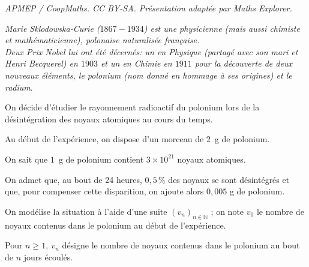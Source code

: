 \documentclass[10pt]{article}
\providecommand{\N}{\mathbb{N}}
\begin{document}
\noindent\textit{APMEP / CoopMaths. CC BY-SA. Présentation adaptée par Maths Explorer.}\par\medskip
\medskip

\emph{Marie Sklodowska-Curie ($1867-1934$) est une physicienne (mais aussi chimiste et mathématicienne), polonaise naturalisée française.\\
Deux Prix Nobel lui ont été décernés: un en Physique (partagé avec son mari et Henri Becquerel) en $1903$ et un en Chimie en $1911$ pour la découverte de deux nouveaux éléments, le polonium (nom donné en hommage à ses origines) et le radium}.

\medskip

On décide d'étudier le rayonnement radioactif du polonium lors de la désintégration des noyaux atomiques au cours du temps.

Au début de l'expérience, on dispose d'un morceau de $2$~g de polonium.

On sait que $1$~g de polonium contient $3 \times 10^{21}$ noyaux atomiques.

On admet que, au bout de 24 heures, $0,5\,\%$ des noyaux se sont désintégrés et que, pour compenser cette disparition, on ajoute alors $0,005$ g de polonium.

On modélise la situation à l'aide d'une suite $\left(v_n\right)_{n \in \N}$ ; on note $v_0$ le nombre de noyaux contenus dans le polonium au début de l'expérience. 

Pour $n \geqslant 1,\: v_n$ désigne le nombre de noyaux contenus dans le polonium au bout de $n$ jours écoulés.

\medskip
\end{document}
